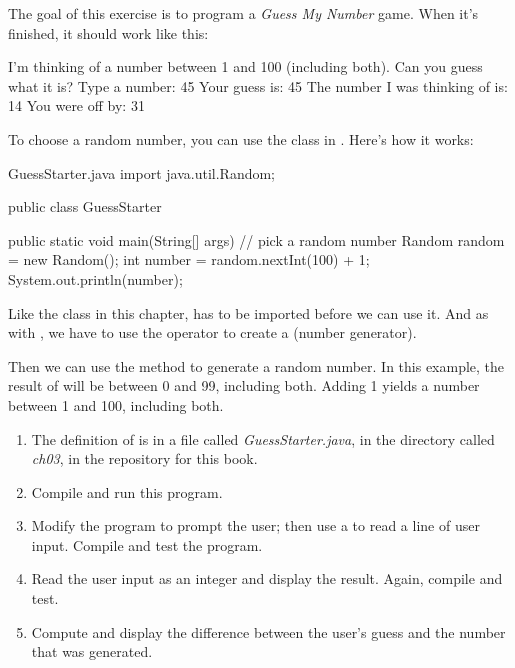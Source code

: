 \begin{exercise}  %
\label{guess}

The goal of this exercise is to program a {\it Guess My Number} game.
When it's finished, it should work like this:

\begin{stdout}
I'm thinking of a number between 1 and 100
(including both). Can you guess what it is?
Type a number: 45
Your guess is: 45
The number I was thinking of is: 14
You were off by: 31
\end{stdout}

To choose a random number, you can use the  class in .
Here's how it works:


\begin{trinket}{GuessStarter.java}
import java.util.Random;

public class GuessStarter {

    public static void main(String[] args) {
        // pick a random number
        Random random = new Random();
        int number = random.nextInt(100) + 1;
        System.out.println(number);
    }
}
\end{trinket}


Like the  class in this chapter,  has to be imported before we can use it.
And as with , we have to use the  operator to create a  (number generator).

Then we can use the method  to generate a random number.
In this example, the result of  will be between 0 and 99, including both.
Adding 1 yields a number between 1 and 100, including both.

\begin{enumerate}

\item The definition of  is in a file called {\it GuessStarter.java}, in the directory called {\it ch03}, in the repository for this book.

\item Compile and run this program.

\item Modify the program to prompt the user; then use a  to read a line of user input.
Compile and test the program.

\item Read the user input as an integer and display the result.
Again, compile and test.

\item Compute and display the difference between the user's guess and the number that was generated.

\end{enumerate}

\end{exercise}

